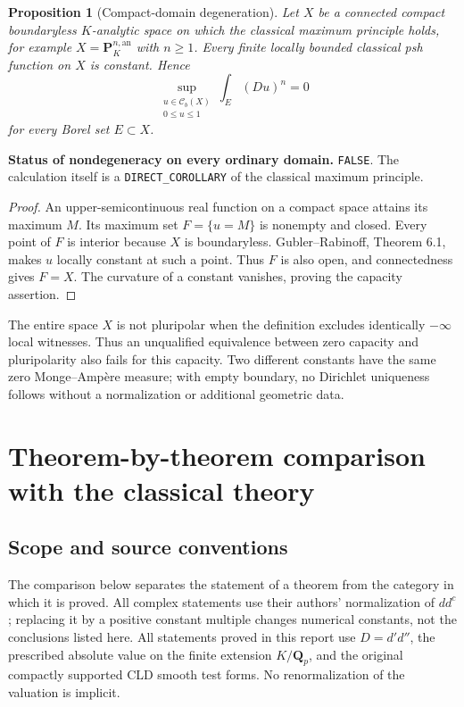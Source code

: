 \documentclass[11pt,a4paper]{article}
\numberwithin{equation}{section}
\newtheorem{proposition}[theorem]{Proposition}
\theoremstyle{definition}
\theoremstyle{remark}
\begin{document}
\begin{proposition}[Compact-domain degeneration]
\label{prop:compact-capacity-zero}
Let \(X\) be a connected compact boundaryless \(K\)-analytic space on
which the classical maximum principle holds, for example
\(X=\mathbf P_K^{n,\mathrm{an}}\) with \(n\geq1\). Every finite
locally bounded classical psh function on \(X\) is constant. Hence
\[
 \sup_{\substack{u\in\mathcal C_b(X)\\0\leq u\leq1}}
       \int_E (Du)^n=0
\]
for every Borel set \(E\subset X\).
\end{proposition}

\noindent\textbf{Status of nondegeneracy on every ordinary domain.}
\texttt{FALSE}. The calculation itself is a
\texttt{DIRECT\_COROLLARY} of the classical maximum principle.

\begin{proof}
An upper-semicontinuous real function on a compact space attains its
maximum \(M\). Its maximum set \(F=\{u=M\}\) is nonempty and closed.
Every point of \(F\) is interior because \(X\) is boundaryless.
Gubler--Rabinoff, Theorem 6.1, makes \(u\) locally constant at such a
point. Thus \(F\) is also open, and connectedness gives \(F=X\).
The curvature of a constant vanishes, proving the capacity assertion.
\end{proof}

The entire space \(X\) is not pluripolar when the definition excludes
identically \(-\infty\) local witnesses. Thus an unqualified equivalence
between zero capacity and pluripolarity also fails for this capacity.
Two different constants have the same zero Monge--Amp\`ere measure;
with empty boundary, no Dirichlet uniqueness follows without a
normalization or additional geometric data.



\section{Theorem-by-theorem comparison with the classical theory}
\label{sec:comparison}

\subsection{Scope and source conventions}

The comparison below separates the statement of a theorem from the category
in which it is proved. All complex statements use their authors' normalization
of \(dd^c\); replacing it by a positive constant multiple changes numerical
constants, not the conclusions listed here. All statements proved in this
report use \(D=d'd''\), the prescribed absolute value on the finite extension
\(K/\mathbf Q_p\), and the original compactly supported CLD smooth test
forms. No renormalization of the valuation is implicit.
\end{document}
